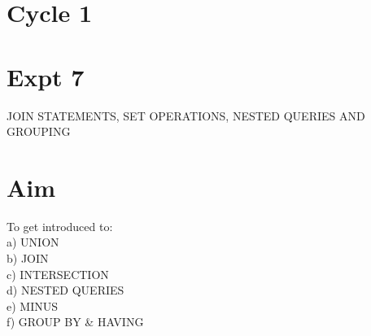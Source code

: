 \documentclass[13pt,oneside]{book}
\begin{document}
\section*{Cycle 1}
\section*{Expt 7}
\begin{center}
    \Large{JOIN STATEMENTS, SET OPERATIONS, NESTED QUERIES AND GROUPING}
\end{center}

\section*{Aim}
\large To get introduced to:\\
a) UNION\\
b) JOIN\\
c) INTERSECTION\\
d) NESTED QUERIES\\
e) MINUS\\
f) GROUP BY \& HAVING\\
\end{document}

